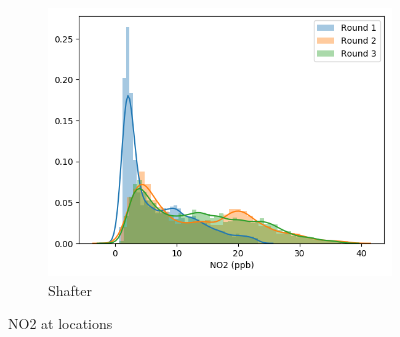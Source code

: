 \documentclass[journal abbreviation, manuscript]{copernicus}
\begin{document}
\begin{figure}[H]
\begin{subfigure}{0.32\textwidth}
\includegraphics[width=\textwidth]{results/distributions/location_shafter_no2.png}
\caption{Shafter}
\end{subfigure}
\caption{NO2 at locations}
\label{fig:no2-locations}
\end{figure}
\end{document}
